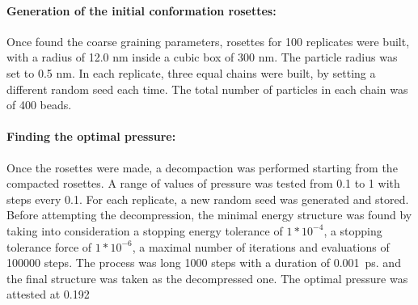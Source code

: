 


\paragraph{Generation of the initial conformation rosettes:}

Once found the coarse graining parameters, rosettes for 100 replicates were built, with a radius of 12.0 nm inside a cubic box of 300 nm. The particle radius was set to 0.5 nm. In each replicate, three equal chains were built, by setting a different random seed each time. The total number of particles in each chain was of 400 beads.



\paragraph{Finding the optimal pressure:}

Once the rosettes were made, a decompaction was performed starting from the compacted rosettes. A range of values of pressure was tested from 0.1 to 1 with steps every 0.1. For each replicate, a new random seed was generated and stored.
Before attempting the decompression, the minimal energy structure was found by taking into consideration a stopping energy tolerance of $1*10^{-4}$, a stopping tolerance force of $1*10^{-6}$, a maximal number of iterations and evaluations of 100000 steps. %
The process was long 1000 steps with a duration of \SI{0.001}{\pico\second}. %
and the final structure was taken as the decompressed one.
The optimal pressure was attested at 0.192 %






